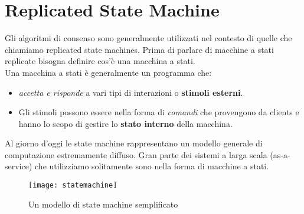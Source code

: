 	\section{Replicated State Machine}
	Gli algoritmi di consenso sono generalmente utilizzati nel contesto di quelle che chiamiamo replicated state machines. Prima di parlare di macchine a stati replicate bisogna definire cos'è una macchina a stati.\\
	Una macchina a stati è generalmente un programma che: 
	\begin{itemize}
		\item{\textit{accetta e risponde} a vari tipi di interazioni o \textbf{stimoli esterni}.}
		\item{Gli stimoli possono essere nella forma di \textit{comandi} che provengono da clients e hanno lo scopo di gestire lo \textbf{stato interno} della macchina.}
	\end{itemize}
	Al giorno d'oggi le state machine rappresentano un modello generale di computazione estremamente diffuso. Gran parte dei sistemi a larga scala (as-a-service) che utilizziamo solitamente sono nella forma di macchine a stati.

	\begin{figure}[H]
		\centering
		\texttt{[image: statemachine]}
		\caption{Un modello di state machine semplificato}
		\label{fig:figure1}
	\end{figure}  
